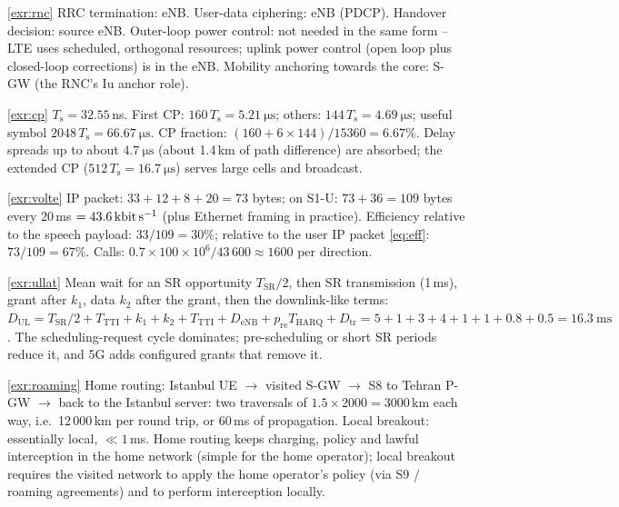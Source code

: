 \documentclass[11pt,a4paper]{article}
\begin{document}
\begin{solutionbox}{\ref{exr:rnc}}
RRC termination: eNB. User-data ciphering: eNB (PDCP). Handover decision: source eNB. Outer-loop
power control: not needed in the same form -- LTE uses scheduled, orthogonal resources; uplink power
control (open loop plus closed-loop corrections) is in the eNB. Mobility anchoring towards the
core: S-GW (the RNC's Iu anchor role).
\end{solutionbox}

\begin{solutionbox}{\ref{exr:cp}}
$T_\mathrm{s} = 32.55$\,ns. First CP: $160\,T_\mathrm{s} = \qty{5.21}{\micro\second}$; others:
$144\,T_\mathrm{s} = \qty{4.69}{\micro\second}$; useful symbol $2048\,T_\mathrm{s} = \qty{66.67}{\micro\second}$.
CP fraction: $(160+6\times144)/15360 = 6.67\%$. Delay spreads up to about $\qty{4.7}{\micro\second}$
(about 1.4\,km of path difference) are absorbed; the extended CP ($512\,T_\mathrm{s} =
\qty{16.7}{\micro\second}$) serves large cells and broadcast.
\end{solutionbox}

\begin{solutionbox}{\ref{exr:volte}}
IP packet: $33+12+8+20 = 73$ bytes; on S1-U: $73+36 = 109$ bytes every 20\,ms $=
\qty{43.6}{\kilo\bit\per\second}$ (plus Ethernet framing in practice). Efficiency relative to the
speech payload: $33/109 = 30\%$; relative to the user IP packet \cref{eq:eff}: $73/109 = 67\%$.
Calls: $0.7\times100\times10^6/43\,600 \approx 1600$ per direction.
\end{solutionbox}

\begin{solutionbox}{\ref{exr:ullat}}
Mean wait for an SR opportunity $T_{\mathrm{SR}}/2$, then SR transmission (1\,ms), grant after $k_1$,
data $k_2$ after the grant, then the downlink-like terms:
$D_{\mathrm{UL}} = T_{\mathrm{SR}}/2 + T_{\mathrm{TTI}} + k_1 + k_2 + T_{\mathrm{TTI}} + D_{\mathrm{eNB}} +
p_{\mathrm{re}}T_{\mathrm{HARQ}} + D_{\mathrm{tr}} = 5 + 1 + 3 + 4 + 1 + 1 + 0.8 + 0.5 = \qty{16.3}{\milli\second}$.
The scheduling-request cycle dominates; pre-scheduling or short SR periods reduce it, and 5G adds
configured grants that remove it.
\end{solutionbox}

\begin{solutionbox}{\ref{exr:roaming}}
Home routing: Istanbul UE $\to$ visited S-GW $\to$ S8 to Tehran P-GW $\to$ back to the Istanbul
server: two traversals of $1.5\times2000 = 3000$\,km each way, i.e.\ 12\,000\,km per round trip, or
60\,ms of propagation. Local breakout: essentially local, $\ll1$\,ms. Home routing keeps charging,
policy and lawful interception in the home network (simple for the home operator); local breakout
requires the visited network to apply the home operator's policy (via S9 / roaming agreements) and
to perform interception locally.
\end{solutionbox}
\end{document}
